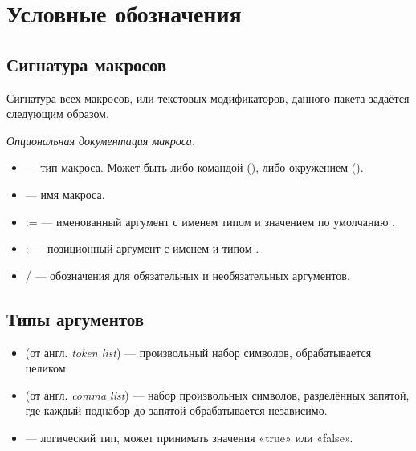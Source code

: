 \section{Условные обозначения}


\subsection*{Сигнатура макросов}

Сигнатура всех макросов, или текстовых модификаторов, данного пакета задаётся следующим образом.
\begin{tcolorbox}
    \rsCode{%
        \rsModifier{}
        {}::
        \rsName{} \\\rsTab{}
        \rsOpt{
            \rsKwarg{}:\rsType{}=\rsDefault{},
            \rsKwarg{}:\rsType{}=\rsDefault{},
            \ldots,
            \rsKwarg{}:\rsType{}=\rsDefault{}
        } \\\rsTab{}
        \rsReq{ \rsArg{}:\rsType{} }
        \rsOpt{ \rsArg{}:\rsType{} }
        \ldots{}
        \rsReq{ \rsArg{}:\rsType{} } \\\\
    }
    \textit{Опциональная документация макроса.}
\end{tcolorbox}

\begin{itemize}
    \item
          \rsModifier{} — тип макроса. Может быть либо командой (\rsModifier[cmd]),
          либо окружением (\rsModifier[env]).

    \item
          \rsName{} — имя макроса.

    \item
          \rsKwarg{}:\rsType{}=\rsDefault{} — именованный аргумент с именем
          \rsKwarg{} типом \rsType{} и значением по умолчанию \rsDefault{}.

    \item
          \rsArg{}:\rsType{} — позиционный аргумент с именем \rsArg{} и типом \rsType{}.

    \item
          \rsReq{\ldots} / \rsOpt{\ldots} — обозначения для обязательных и необязательных аргументов.
\end{itemize}


\subsection*{Типы аргументов}

\begin{itemize}
    \item
          \rsType[tl] (от англ. \textit{token list}) — произвольный набор символов, обрабатывается целиком.

    \item
          \rsType[clist] (от англ. \textit{comma list}) — набор произвольных символов,
          разделённых запятой, где
          каждый поднабор до запятой обрабатывается независимо.

    \item
          \rsType[bool] — логический тип, может принимать значения «true» или «false».
\end{itemize}
